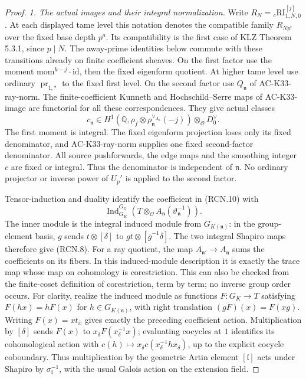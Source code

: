 \begin{proof}
\emph{1. The actual images and their integral normalization.}
Write \(R_N={}_c\mathrm{RI}^{[j]}_{1,N,0}\).
At each displayed tame level this notation denotes the compatible
family \(R_{Np^r}\) over the fixed base depth \(p^a\).
Its compatibility is the first case of KLZ Theorem 5.3.1,
since \(p\mid N\).  The away-prime identities below commute
with these transitions already on finite coefficient sheaves.
On the first factor use the moment
\(\mathrm{mom}^{k-j}\cdot\mathrm{id}\), then the fixed
eigenform quotient.  At higher tame level use ordinary
\(\operatorname{pr}_{1,*}\) to the fixed first level.
On the second factor use \(Q_{\mathfrak n}\) of
AC-K33-ray-norm.  The finite-coefficient Kunneth and
Hochschild--Serre maps of AC-K33-image are functorial
for all these correspondences.  They give actual classes
\[
 c_{\mathfrak n}\in
 H^1\!\left(\mathbb Q,
    \rho_f\otimes
     \rho_{\mathfrak n}^{\vee_{A_{\mathfrak n}}}(-j)\right)
           \otimes_{\mathcal O}D_0^\vee .
 \tag{RCN.10}
\]
The first moment is integral.  The fixed eigenform
projection loses only its fixed denominator, and
AC-K33-ray-norm supplies one fixed second-factor
denominator.  All source pushforwards, the edge maps
and the smoothing integer \(c\) are fixed or integral.
Thus the denominator is independent of \(\mathfrak n\).
No ordinary projector or inverse power of \(U_p'\)
is applied to the second factor.

Tensor-induction and duality identify the coefficient in
(RCN.10) with
\[
 \operatorname{Ind}_{G_K}^{G_{\mathbb Q}}
        \left(T\otimes_{\mathcal O}
                    A_{\mathfrak n}(\vartheta_{\mathfrak n}^{-1})\right).
 \tag{RCN.11}
\]
The inner module is the integral induced module from
\(G_{K(\mathfrak n)}\): in the group-element basis,
\(g\) sends \(t\otimes[\delta]\) to
\(gt\otimes[\bar g^{-1}\delta]\).
The two integral Shapiro maps therefore give (RCN.8).
For a ray quotient, the map \(A_{\mathfrak n'}\to
A_{\mathfrak n}\) sums the coefficients on its fibers.
In this induced-module description it is exactly the
trace map whose map on cohomology is corestriction.
This can also be checked from the finite-coset definition
of corestriction, term by term; no inverse group order
occurs.
For clarity, realize the induced module as functions
\(F:G_K\to T\) satisfying \(F(hx)=hF(x)\) for
\(h\in G_{K(\mathfrak n)}\), with right translation
\((gF)(x)=F(xg)\).  Writing \(F(x)=x t_{\bar x}\)
gives exactly the preceding coefficient action.  Multiplication
by \([\delta]\) sends \(F(x)\) to
\(x_\delta F(x_\delta^{-1}x)\); evaluating cocycles at
\(1\) identifies its cohomological action with
\(c(h)\mapsto x_\delta c(x_\delta^{-1}hx_\delta)\),
up to the explicit cocycle coboundary.  Thus multiplication
by the geometric Artin element \([\mathfrak l]\) acts
under Shapiro by \(\sigma_{\mathfrak l}^{-1}\),
with the usual Galois action on the extension field.


\end{proof}
